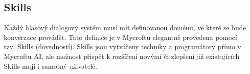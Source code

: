 \documentclass[12pt]{article}
\begin{document}
	\subsection{Skills}
	Každý hlasový dialogový systém musí mít definovanou doménu, ve které se bude konverzace provádět. Tato definice je v Mycroftu elegantně provedena pomocí tzv. Skills (dovedností). Skills jsou vytvářeny techniky a programátory přímo v Mycroftu AI, ale možnost přispět k rozšíření novými či zlepšení již existujících Skills mají i samotný uživatelé.

	
	
\end{document}
